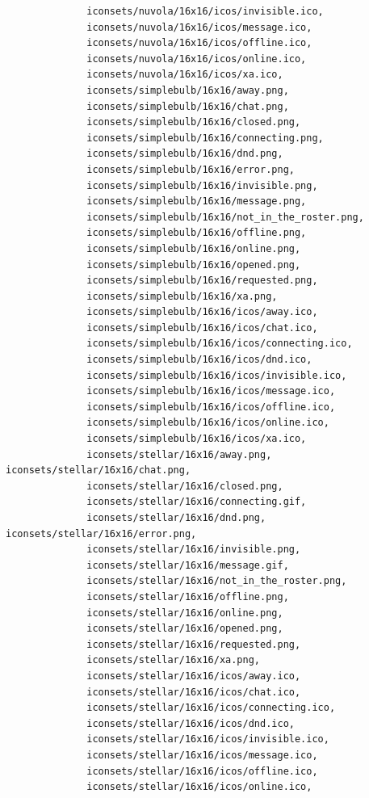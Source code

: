 \documentclass[a4paper]{article}
\begin{document}
\begin{verbatim}
              iconsets/nuvola/16x16/icos/invisible.ico,
              iconsets/nuvola/16x16/icos/message.ico,
              iconsets/nuvola/16x16/icos/offline.ico,
              iconsets/nuvola/16x16/icos/online.ico,
              iconsets/nuvola/16x16/icos/xa.ico,
              iconsets/simplebulb/16x16/away.png,
              iconsets/simplebulb/16x16/chat.png,
              iconsets/simplebulb/16x16/closed.png,
              iconsets/simplebulb/16x16/connecting.png,
              iconsets/simplebulb/16x16/dnd.png,
              iconsets/simplebulb/16x16/error.png,
              iconsets/simplebulb/16x16/invisible.png,
              iconsets/simplebulb/16x16/message.png,
              iconsets/simplebulb/16x16/not_in_the_roster.png,
              iconsets/simplebulb/16x16/offline.png,
              iconsets/simplebulb/16x16/online.png,
              iconsets/simplebulb/16x16/opened.png,
              iconsets/simplebulb/16x16/requested.png,
              iconsets/simplebulb/16x16/xa.png,
              iconsets/simplebulb/16x16/icos/away.ico,
              iconsets/simplebulb/16x16/icos/chat.ico,
              iconsets/simplebulb/16x16/icos/connecting.ico,
              iconsets/simplebulb/16x16/icos/dnd.ico,
              iconsets/simplebulb/16x16/icos/invisible.ico,
              iconsets/simplebulb/16x16/icos/message.ico,
              iconsets/simplebulb/16x16/icos/offline.ico,
              iconsets/simplebulb/16x16/icos/online.ico,
              iconsets/simplebulb/16x16/icos/xa.ico,
              iconsets/stellar/16x16/away.png, iconsets/stellar/16x16/chat.png,
              iconsets/stellar/16x16/closed.png,
              iconsets/stellar/16x16/connecting.gif,
              iconsets/stellar/16x16/dnd.png, iconsets/stellar/16x16/error.png,
              iconsets/stellar/16x16/invisible.png,
              iconsets/stellar/16x16/message.gif,
              iconsets/stellar/16x16/not_in_the_roster.png,
              iconsets/stellar/16x16/offline.png,
              iconsets/stellar/16x16/online.png,
              iconsets/stellar/16x16/opened.png,
              iconsets/stellar/16x16/requested.png,
              iconsets/stellar/16x16/xa.png,
              iconsets/stellar/16x16/icos/away.ico,
              iconsets/stellar/16x16/icos/chat.ico,
              iconsets/stellar/16x16/icos/connecting.ico,
              iconsets/stellar/16x16/icos/dnd.ico,
              iconsets/stellar/16x16/icos/invisible.ico,
              iconsets/stellar/16x16/icos/message.ico,
              iconsets/stellar/16x16/icos/offline.ico,
              iconsets/stellar/16x16/icos/online.ico,

\end{verbatim}
\end{document}
